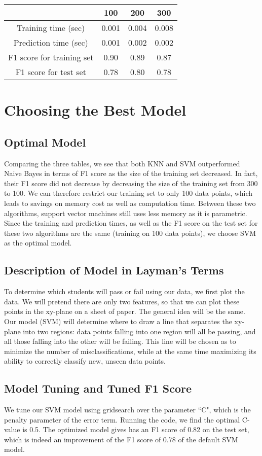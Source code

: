 \documentclass[12 pt]{article}
\numberwithin{equation}{section}
\begin{document}
\begin{center}
  \begin{tabular}{| c | c | c | c | }
    \hline
    & 100 & 200 & 300 \\ \hline
    Training time (sec) & 0.001 & 0.004 & 0.008 \\ \hline
    Prediction time (sec) & 0.001 & 0.002 & 0.002 \\ \hline 
    F1 score for training set & 0.90 & 0.89 & 0.87 \\ \hline
    F1 score for test set & 0.78 & 0.80 & 0.78 \\ \hline
  \end{tabular}
\end{center}

\section{Choosing the Best Model}
\subsection{Optimal Model}
Comparing the three tables, we see that both KNN and SVM outperformed Naive Bayes in terms of F1 score as the size of the training set decreased. In fact, their F1 score did not decrease by decreasing the size of the training set from 300 to 100. We can therefore restrict our training set to only 100 data points, which leads to savings on memory cost as well as computation time. Between these two algorithms, support vector machines still uses less memory as it is parametric. Since the training and prediction times, as well as the F1 score on the test set for these two algorithms are the same (training on 100 data points), we choose SVM as the optimal model.
\subsection{Description of Model in Layman's Terms}
To determine which students will pass or fail using our data, we first plot the data. We will pretend there are only two features, so that we can plot these points in the xy-plane on a sheet of paper. The general idea will be the same. Our model (SVM) will determine where to draw a line that separates the xy-plane into two regions: data points falling into one region will all be passing, and all those falling into the other will be failing. This line will be chosen as to minimize the number of misclassifications, while at the same time maximizing its ability to correctly classify new, unseen data points.

\subsection{Model Tuning and Tuned F1 Score}
We tune our SVM model using gridsearch over the parameter ``C", which is the penalty parameter of the error term. Running the code, we find the optimal C-value is 0.5. The optimized model gives has an F1 score of 0.82 on the test set, which is indeed an improvement of the F1 score of 0.78 of the default SVM model.
\end{document}
